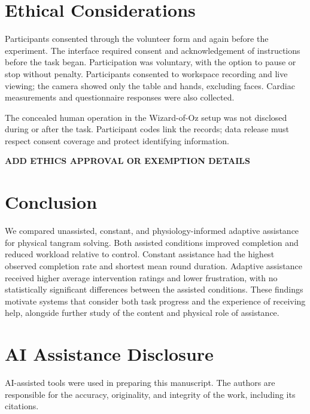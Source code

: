 \documentclass[sigconf,anonymous,balance=false]{aamas}
\begin{document}
\section{Ethical Considerations}

Participants consented through the volunteer form and again before the experiment. The interface required consent and acknowledgement of instructions before the task began. Participation was voluntary, with the option to pause or stop without penalty. Participants consented to workspace recording and live viewing; the camera showed only the table and hands, excluding faces. Cardiac measurements and questionnaire responses were also collected.

The concealed human operation in the Wizard-of-Oz setup was not disclosed during or after the task. Participant codes link the records; data release must respect consent coverage and protect identifying information.

\textbf{ADD ETHICS APPROVAL OR EXEMPTION DETAILS}

\section{Conclusion}

We compared unassisted, constant, and physiology-informed adaptive assistance for physical tangram solving. Both assisted conditions improved completion and reduced workload relative to control. Constant assistance had the highest observed completion rate and shortest mean round duration. Adaptive assistance received higher average intervention ratings and lower frustration, with no statistically significant differences between the assisted conditions. These findings motivate systems that consider both task progress and the experience of receiving help, alongside further study of the content and physical role of assistance.

\section*{AI Assistance Disclosure}

AI-assisted tools were used in preparing this manuscript. The authors are responsible for the accuracy, originality, and integrity of the work, including its citations.



\end{document}
